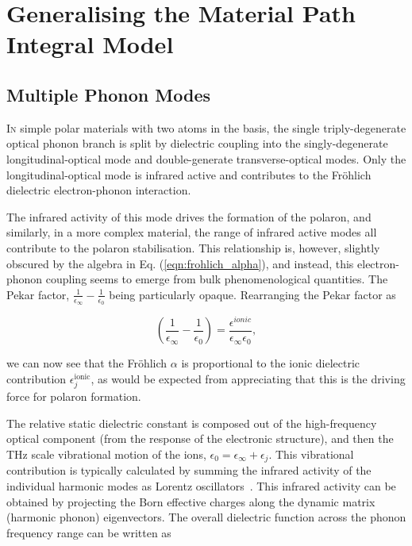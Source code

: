 \chapter{Generalising the Material Path Integral Model}
\label{chap:3}



\section{Multiple Phonon Modes}
\label{sec:3-1}

\lettrine{I}n simple polar materials with two atoms in the basis, the single triply-degenerate optical phonon branch is split by dielectric coupling into the singly-degenerate longitudinal-optical mode and double-generate transverse-optical modes. Only the longitudinal-optical mode is infrared active and contributes to the Fr\"ohlich dielectric electron-phonon interaction. 

The infrared activity of this mode drives the formation of the polaron, and similarly, in a more complex material, the range of infrared active modes all contribute to the polaron stabilisation. This relationship is, however, slightly obscured by the algebra in Eq. (\ref{eqn:frohlich_alpha}), and instead, this electron-phonon coupling seems to emerge from bulk phenomenological quantities. The Pekar factor, $\frac{1}{\epsilon_{\infty}}-\frac{1}{\epsilon_{0}}$ being particularly opaque. Rearranging the Pekar factor as

\begin{equation}
    \left( \frac{1}{\epsilon_{\infty}} - \frac{1}{\epsilon_{0}} \right) = \frac{\epsilon^{ionic}}{\epsilon_{\infty}\epsilon_{0}},
    \label{eqn:pekar}
\end{equation}

we can now see that the Fr\"ohlich $\alpha$ is proportional to the ionic dielectric contribution $\epsilon^{\text{ionic}}_j$, as would be expected from appreciating that this is the driving force for polaron formation. 

The relative static dielectric constant is composed out of the high-frequency optical component (from the response of the electronic structure), and then the THz scale vibrational motion of the ions, $\epsilon_{0}=\epsilon_{\infty}+\epsilon_{j}$. This vibrational contribution is typically calculated by summing the infrared activity of the individual harmonic modes as Lorentz oscillators~\cite{gonze_dynamical_1997}. This infrared activity can be obtained by projecting the Born effective charges along the dynamic matrix (harmonic phonon) eigenvectors. The overall dielectric function across the phonon frequency range can be written as 

